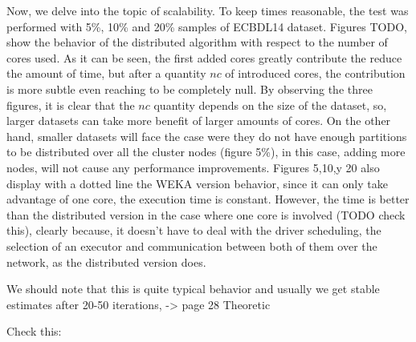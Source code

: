 Now, we delve into the topic of scalability. To keep times reasonable, the test was performed with 5\%, 10\% and 20\% samples of ECBDL14 dataset. Figures {TODO}, show the behavior of the distributed algorithm with respect to the number of cores used. As it can be seen, the first added cores greatly contribute the reduce the amount of time, but after a quantity $nc$ of introduced cores, the contribution is more subtle even reaching to be completely null. By observing the three figures, it is clear that the $nc$ quantity depends on the size of the dataset, so, larger datasets can take more benefit of larger amounts of cores. On the other hand, smaller datasets will face the case were they do not have enough partitions to be distributed over all the cluster nodes (figure 5\%), in this case, adding more nodes, will not cause any performance improvements.
Figures {5,10,y 20} also display with a dotted line the WEKA version behavior, since it can only take advantage of one core, the execution time is constant. However, the time is better than the distributed version in the case where one core is involved (TODO check this), clearly because, it doesn't have to deal with the driver scheduling, the selection of an executor and communication between both of them over the network, as the distributed version does.









% 



We should note that this is quite typical behavior and usually we get stable estimates after 20-50 iterations, -> page 28 Theoretic

Check this:



